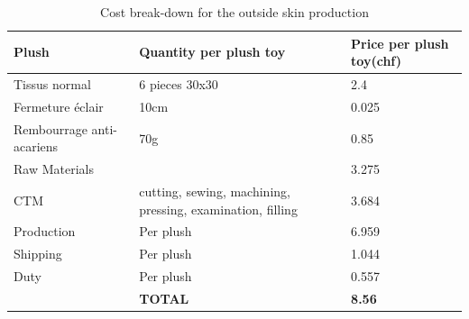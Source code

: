 \begin{table}[]
\centering
\caption{Cost break-down for the outside skin production}
\label{tab:cost-skin}
\begin{tabular}{l|p{4.5cm}||p{4.5cm}|}
\hline
\multicolumn{1}{|l|}{\textbf{Plush}}                           & \textbf{Quantity per plush toy}        & \textbf{Price per plush toy(chf)} \\ \hline \hline
\multicolumn{1}{|l|}{Tissus normal}                            & 6 pieces 30x30                                               & 2.4                               \\ \hline
\multicolumn{1}{|l|}{Fermeture éclair}                         & 10cm                                                         & 0.025                              \\ \hline
\multicolumn{1}{|l|}{Rembourrage anti-acariens} & 70g                                                          & 0.85                              \\ \hline
\multicolumn{1}{|l|}{Raw Materials}                            &                                                              & 3.275                              \\ \hline
\multicolumn{1}{|l|}{CTM}                                      & cutting, sewing, machining, pressing, examination, filling & 3.684                       \\ \hline
\multicolumn{1}{|l|}{Production}                               & Per plush                                                    & 6.959                       \\ \hline
\multicolumn{1}{|l|}{Shipping}                                 & Per plush                                                    & 1.044                       \\ \hline
\multicolumn{1}{|l|}{Duty}                                     & Per plush                                                    & 0.557                         \\ \hline
                                                               & \textbf{TOTAL}                                  & \textbf{8.56} \\ \cline{2-3} 
\end{tabular}
\end{table}

